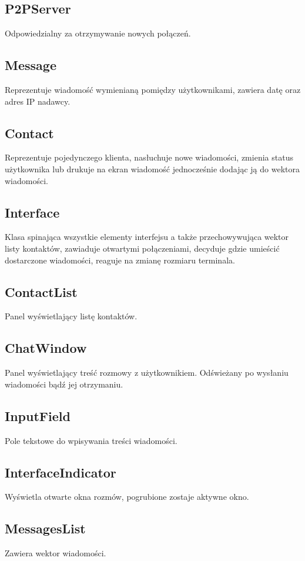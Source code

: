\documentclass[11pt,a4paper]{article}
\begin{document}
\subsection{P2PServer}
Odpowiedzialny za otrzymywanie nowych połączeń.

\subsection{Message}
Reprezentuje wiadomość wymienianą pomiędzy użytkownikami, zawiera datę oraz adres IP nadawcy.

\subsection{Contact}
Reprezentuje pojedynczego klienta, nasłuchuje nowe wiadomości, zmienia status użytkownika lub drukuje na ekran wiadomość jednocześnie dodając ją do wektora wiadomości.

\subsection{Interface}
Klasa spinająca wszystkie elementy interfejsu a także przechowywująca wektor listy kontaktów, zawiaduje otwartymi połączeniami, decyduje gdzie umieścić dostarczone wiadomości, reaguje na zmianę rozmiaru terminala.

\subsection{ContactList}
Panel wyświetlający listę kontaktów.

\subsection{ChatWindow}
Panel wyświetlający treść rozmowy z użytkownikiem. Odświeżany po wysłaniu wiadomości bądź jej otrzymaniu. 

\subsection{InputField}
Pole tekstowe do wpisywania treści wiadomości.

\subsection{InterfaceIndicator}
Wyświetla otwarte okna rozmów, pogrubione zostaje aktywne okno.

\subsection{MessagesList}
Zawiera wektor wiadomości.
\end{document}
